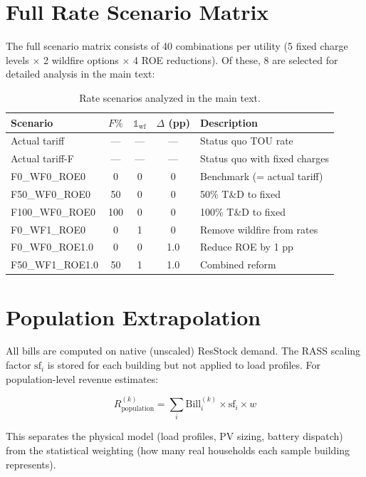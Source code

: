 \documentclass[9pt]{article}
\begin{document}
\section{Full Rate Scenario Matrix}
\label{sec:scenarios}

The full scenario matrix consists of 40 combinations per utility (5 fixed charge levels $\times$ 2 wildfire options $\times$ 4 ROE reductions). Of these, 8 are selected for detailed analysis in the main text:

\begin{table}[htbp]
\centering
\caption{Rate scenarios analyzed in the main text.}
\begin{tabular}{l c c c l}
\toprule
\textbf{Scenario} & $F\%$ & $\mathbb{1}_{\text{wf}}$ & $\Delta$ (pp) & \textbf{Description} \\
\midrule
Actual tariff & --- & --- & --- & Status quo TOU rate \\
Actual tariff-F & --- & --- & --- & Status quo with fixed charges \\
F0\_WF0\_ROE0 & 0 & 0 & 0 & Benchmark (= actual tariff) \\
F50\_WF0\_ROE0 & 50 & 0 & 0 & 50\% T\&D to fixed \\
F100\_WF0\_ROE0 & 100 & 0 & 0 & 100\% T\&D to fixed \\
F0\_WF1\_ROE0 & 0 & 1 & 0 & Remove wildfire from rates \\
F0\_WF0\_ROE1.0 & 0 & 0 & 1.0 & Reduce ROE by 1 pp \\
F50\_WF1\_ROE1.0 & 50 & 1 & 1.0 & Combined reform \\
\bottomrule
\end{tabular}
\end{table}

\section{Population Extrapolation}
\label{sec:extrapolation}

All bills are computed on native (unscaled) ResStock demand. The RASS scaling factor $\text{sf}_i$ is stored for each building but not applied to load profiles. For population-level revenue estimates:

\begin{equation}
R_{\text{population}}^{(k)} = \sum_i \text{Bill}_i^{(k)} \times \text{sf}_i \times w
\end{equation}

This separates the physical model (load profiles, PV sizing, battery dispatch) from the statistical weighting (how many real households each sample building represents).
\end{document}
